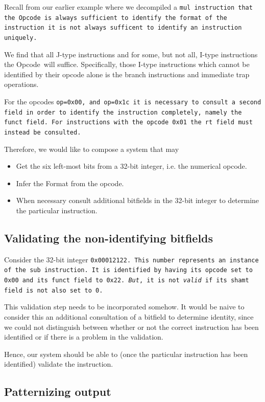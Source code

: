 \documentclass[a4paper]{article}
\newcommand{\opcode}{Opcode\ }
\begin{document}
Recall from our earlier example where we decompiled a \tt{mul}
instruction that the \opcode is always sufficient to identify
the format of the instruction it is not always sufficent to
identify an instruction uniquely.

We find that all J-type instructions and for some, but not all, I-type
instructions the \opcode will suffice. Specifically, those I-type
instructions which cannot be identified by their opcode alone is the
branch instructions and immediate trap operations.

For the opcodes \tt{op=0x00}, and \tt{op=0x1c} it is necessary to
consult a second field in order to identify the instruction
completely, namely the \tt{funct} field. For instructions with the
opcode \tt{0x01} the \tt{rt} field must instead be consulted.

Therefore, we would like to compose a system that may

\begin{itemize}
\item Get the six left-most bits from a 32-bit integer, i.e. the numerical opcode.
\item Infer the Format from the opcode.
\item When necessary consult additional bitfields in the 32-bit integer to
      determine the particular instruction.
\end{itemize}

\subsection{Validating the non-identifying bitfields}\label{section:validation}

Consider the 32-bit integer \tt{0x00012122}. This number represents an
instance of the \tt{sub} instruction. It is identified by
having its opcode set to \tt{0x00} and its funct field to \tt{0x22}.
\emph{But}, it is not \emph{valid} if its shamt field is not also set to 0.

This validation step needs to be incorporated somehow. It would be
naive to consider this an additional consultation of a bitfield to
determine identity, since we could not distinguish between whether or
not the correct instruction has been identified or if there is a
problem in the validation.

Hence, our system should be able to (once the particular instruction
has been identified) validate the instruction.

\subsection{Patternizing output}\label{section:patternizing}
\end{document}
